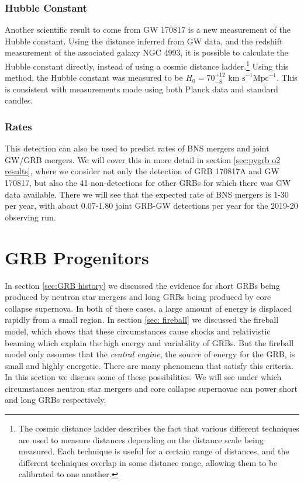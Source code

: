 \documentclass[11pt]{cuthesis}
\begin{document}
\subsubsection{Hubble Constant}
Another scientific result to come from GW 170817 is a new measurement of the Hubble constant. Using the distance inferred from GW data, and the redshift measurement of the associated galaxy NGC 4993, it is possible to calculate the Hubble constant directly, instead of using a cosmic distance ladder.\footnote{The cosmic distance ladder describes the fact that various different techniques are used to measure distances depending on the distance scale being measured. Each technique is useful for a certain range of distances, and the different techniques overlap in some distance range, allowing them to be calibrated to one another.} Using this method, the Hubble constant was measured to be $H_0 = 70^{+12}_{-8} \text{ km s}^{-1} \text{Mpc}^{-1}$. This is consistent with measurements made using both Planck data and standard candles. 

\subsubsection{Rates}
This detection can also be used to predict rates of BNS mergers and joint GW/GRB mergers. We will cover this in more detail in section \ref{sec:pygrb o2 results}, where we consider not only the detection of GRB 170817A and GW 170817, but also the 41 non-detections for other GRBs for which there was GW data available. There we will see that the expected rate of BNS mergers is 1-30 per year, with about 0.07-1.80 joint GRB-GW detections per year for the 2019-20 observing run.


\section{GRB Progenitors} \label{sec: grb prog}
In section \ref{sec:GRB history} we discussed the evidence for short GRBs being produced by neutron star mergers and long GRBs being produced by core collapse supernova. In both of these cases, a large amount of energy is displaced rapidly from a small region. In section \ref{sec: fireball} we discussed  the fireball model, which shows that these circumstances cause shocks and relativistic beaming which explain the high energy and variability of GRBs. But the fireball model only assumes that the \textit{central engine}, the source of energy for the GRB, is small and highly energetic. There are many phenomena that satisfy this criteria. In this section we discuss some of these possibilities. We will see under which circumstances neutron star mergers and core collapse supernovae can power short and long GRBs respectively.
\end{document}
